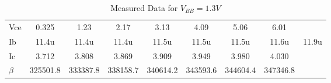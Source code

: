 \begin{table}[H]
\begin{tabular}{ccccccccc}
            \multicolumn{1}{l|}{Vce}     & \multicolumn{1}{c}{0.325}    & \multicolumn{1}{c}{1.23}     & \multicolumn{1}{c}{2.17}     & \multicolumn{1}{c}{3.13}     & \multicolumn{1}{c}{4.09}     & \multicolumn{1}{c}{5.06}     & \multicolumn{1}{c}{6.01}     &          \\
            \multicolumn{1}{l|}{Ib}      & \multicolumn{1}{c}{11.4u}    & \multicolumn{1}{c}{11.4u}    & \multicolumn{1}{c}{11.4u}    & \multicolumn{1}{c}{11.5u}    & \multicolumn{1}{c}{11.5u}    & \multicolumn{1}{c}{11.5u}    & \multicolumn{1}{c}{11.6u}    & 11.9u    \\
            \multicolumn{1}{l|}{Ic}      & \multicolumn{1}{c}{3.712}    & \multicolumn{1}{c}{3.808}    & \multicolumn{1}{c}{3.869}    & \multicolumn{1}{c}{3.909}    & \multicolumn{1}{c}{3.949}    & \multicolumn{1}{c}{3.980}    & \multicolumn{1}{c}{4.030}    &          \\
            \multicolumn{1}{l|}{$\beta$} & \multicolumn{1}{c}{325501.8} & \multicolumn{1}{c}{333387.8} & \multicolumn{1}{c}{338158.7} & \multicolumn{1}{c}{340614.2} & \multicolumn{1}{c}{343593.6} & \multicolumn{1}{c}{344604.4} & \multicolumn{1}{c}{347346.8} &          \\
        \hline    
        \end{tabular}
            \caption{Measured Data for $V_{BB}=1.3V$}
            \end{table}

